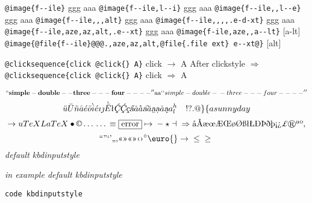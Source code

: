 \documentclass{book}
\begin{document}
\texttt{@image\{f{-}{-}ile\}} ggg
aaa
\texttt{@image\{f{-}{-}ile,l{-}{-}i\}} ggg
aaa
\texttt{@image\{f{-}{-}ile,,l{-}{-}e\}} ggg
aaa
\texttt{@image\{f{-}{-}ile,,,alt\}} ggg
aaa
\texttt{@image\{f{-}{-}ile,,,,.e-d-xt\}} ggg
aaa
\texttt{@image\{f{-}{-}ile,aze,az,alt,.e{-}{-}xt\}} ggg
aaa
\texttt{@image\{f-ile,aze,,a{-}{-}lt\}} [a-lt]
\texttt{@image\{@file\{f{-}{-}ile\}@@@.,aze,az,alt,@file\{.file ext\} e{-}{-}xt@\}} [alt]


\texttt{@clicksequence\{click @click\{\} A\}} click $\rightarrow{}$ A
After clickstyle $\Rightarrow{}$
\texttt{@clicksequence\{click @click\{\} A\}} click $\Rightarrow{}$ A


$$
\mathbf{``simple-double--three---four----''} \hbox{aa}
`\hbox{}`simple-double-\hbox{}-three---four----'\hbox{}'\leavevmode{}\\
$$
$$
\ddot{u} \ddot{U} \tilde{n} \hat{a} \acute{e} \bar{o} \grave{i} \acute{e} \imath{} \jmath{} \grave{\bar{E}}
\mathord{\text{\l{}}} \textsl{\c{\'{C}}} \textsl{\c{\'{C}}} \textsl{\c{c}} \textsl{\H{a}} \dot{a} \mathring{a} \textsl{\t{a}}
\breve{a} \textsl{\b{a}} \textsl{\d{a}} \check{a} \textsl{\k{a}} a^{h}_{l}
\leavevmode{}\\ \ {}\ {} \ {}\-{}   ! ? . @ \} \{ 
a sunny day
$$
$$
\rightarrow{}
u
TeX LaTeX \bullet{} \copyright{} \dots{} \dots{} \equiv{}
\fbox{error} \mapsto{} - \star{} \dashv{} \Rightarrow{}
\mathord{\text{\aa{}}} \mathord{\text{\AA{}}} \mathord{\text{\ae{}}} \mathord{\text{\oe{}}} \mathord{\text{\AE{}}} \mathord{\text{\OE{}}} \mathord{\text{\o{}}} \mathord{\text{\O{}}} \mathord{\text{\ss{}}} \mathord{\text{\l{}}} \mathord{\text{\L{}}} \mathord{\text{\DH{}}}
\mathord{\text{\TH{}}} \mathord{\text{\dh{}}} \mathord{\text{\th{}}} \mathord{\text{\textexclamdown{}}} \mathord{\text{\textquestiondown{}}} \mathsterling{}
\circledR{} \mathord{\text{\textordfeminine{}}} \mathord{\text{\textordmasculine{}}} , 
$$
$$
\mathord{\text{\textquotedblleft{}}} \mathord{\text{\textquotedblright{}}} 
\mathord{\text{\textquoteleft{}}} \mathord{\text{\textquoteright{}}} \mathord{\text{\quotedblbase{}}} \mathord{\text{\quotesinglbase{}}} \mathord{\text{\guillemotleft{}}}
\mathord{\text{\guillemotright{}}} \mathord{\text{\guillemotleft{}}} \mathord{\text{\guillemotright{}}} \mathord{\text{\guilsinglleft{}}}
\mathord{\text{\guilsinglright{}}} ^{\circ{}} \euro{} \rightarrow{} \leq{} \geq{}
$$
{\ttfamily\textsl{default kbdinputstyle}}


{\ttfamily\textsl{in example default kbdinputstyle}}


\texttt{code kbdinputstyle}
\end{document}
